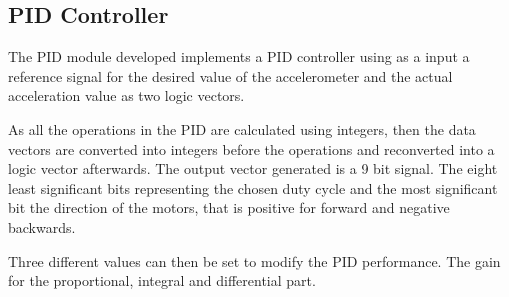 \subsection{PID Controller}

The PID module developed implements a PID controller using as a input a reference signal for the desired value of the accelerometer and the actual acceleration value as two logic vectors.

As all the operations in the PID are calculated using integers, then the data vectors are converted into integers before the operations and reconverted into a logic vector afterwards.
The output vector generated is a 9 bit signal.
The eight least significant bits representing the chosen duty cycle and the most significant bit the direction of the motors, that is positive for forward and negative backwards.

Three different values can then be set to modify the PID performance.
The gain for the proportional, integral and differential part.
